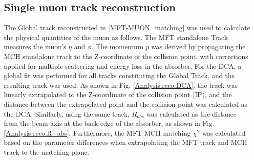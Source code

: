     \subsection{Single muon track reconstruction}
    \label{Single_reco}
        The Global track reconstructed in \ref{MFT-MUON_matching} was used to calculate the physical quantities of the muon as follows. The MFT standalone Track measures the muon's $\eta$ and $\phi$. The momentum $p$ was derived by propagating the MCH standalone track to the Z-coordinate of the collision point, with corrections applied for multiple scattering and energy loss in the absorber.
        For the DCA, a global fit was performed for all tracks constituting the Global Track, and the resulting track was used. 
        As shown in Fig. \ref{Analysis:reco:DCA}, the track was linearly extrapolated to the Z-coordinate of the collision point (IP), and the distance between the extrapolated point and the collision point was calculated as the DCA. Similarly, using the same track, $R_{abs}$ was calculated as the distance from the beam axis at the back edge of the absorber, as shown in Fig. \ref{Analysis:reco:R_abs}.\@
        Furthermore, the MFT-MCH matching $\chi^2$ was calculated based on the parameter differences when extrapolating the MFT track and MCH track to the matching plane.
